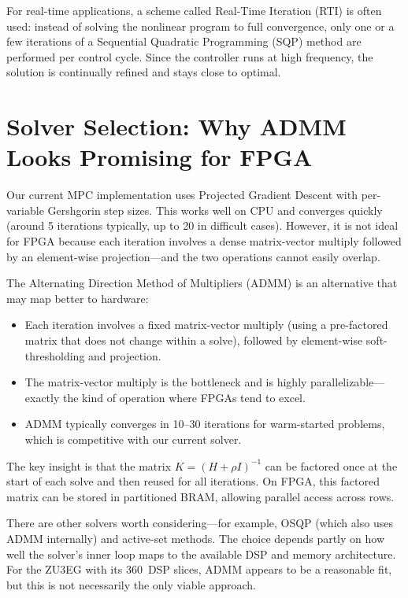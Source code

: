 \documentclass[12pt,a4paper]{article}
\begin{document}
For real-time applications, a scheme called Real-Time Iteration (RTI) is often used: instead of solving the nonlinear program to full convergence, only one or a few iterations of a Sequential Quadratic Programming (SQP) method are performed per control cycle. Since the controller runs at high frequency, the solution is continually refined and stays close to optimal.

\section{Solver Selection: Why ADMM Looks Promising for FPGA}

Our current MPC implementation uses Projected Gradient Descent with per-variable Gershgorin step sizes. This works well on CPU and converges quickly (around 5 iterations typically, up to 20 in difficult cases). However, it is not ideal for FPGA because each iteration involves a dense matrix-vector multiply followed by an element-wise projection---and the two operations cannot easily overlap.

The Alternating Direction Method of Multipliers (ADMM) is an alternative that may map better to hardware:

\begin{itemize}
    \item Each iteration involves a fixed matrix-vector multiply (using a pre-factored matrix that does not change within a solve), followed by element-wise soft-thresholding and projection.
    \item The matrix-vector multiply is the bottleneck and is highly parallelizable---exactly the kind of operation where FPGAs tend to excel.
    \item ADMM typically converges in 10--30 iterations for warm-started problems, which is competitive with our current solver.
\end{itemize}

The key insight is that the matrix $K = (H + \rho I)^{-1}$ can be factored once at the start of each solve and then reused for all iterations. On FPGA, this factored matrix can be stored in partitioned BRAM, allowing parallel access across rows.

There are other solvers worth considering---for example, OSQP (which also uses ADMM internally) and active-set methods. The choice depends partly on how well the solver's inner loop maps to the available DSP and memory architecture. For the ZU3EG with its 360~DSP slices, ADMM appears to be a reasonable fit, but this is not necessarily the only viable approach.
\end{document}
